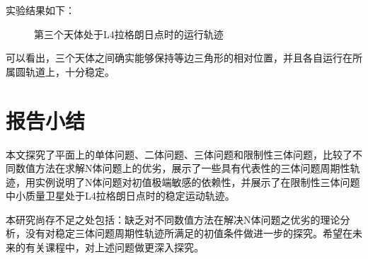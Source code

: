\documentclass{article}
\begin{document}
\par 实验结果如下：
\begin{figure}[H]
	\centering  %
	\caption{第三个天体处于L4拉格朗日点时的运行轨迹}
	\label{lagrange}
\end{figure}
\par 可以看出，三个天体之间确实能够保持等边三角形的相对位置，并且各自运行在所属圆轨道上，十分稳定。
\section{报告小结}
\par 本文探究了平面上的单体问题、二体问题、三体问题和限制性三体问题，比较了不同数值方法在求解N体问题上的优劣，展示了一些具有代表性的三体问题周期性轨迹，用实例说明了N体问题对初值极端敏感的依赖性，并展示了在限制性三体问题中小质量卫星处于L4拉格朗日点时的稳定运动轨迹。
\par 本研究尚存不足之处包括：缺乏对不同数值方法在解决N体问题之优劣的理论分析，没有对稳定三体问题周期性轨迹所满足的初值条件做进一步的探究。希望在未来的有关课程中，对上述问题做更深入探究。


\end{document}
